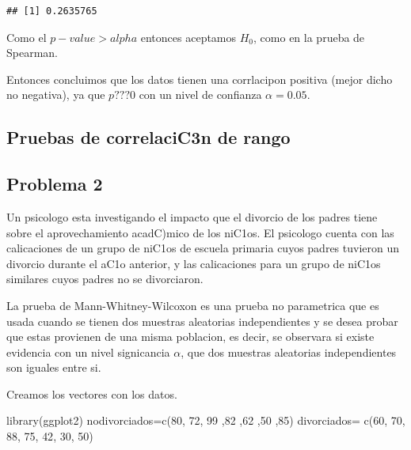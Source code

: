\documentclass[
]{article}
\newenvironment{Shaded}{\begin{snugshade}}{\end{snugshade}}
\newcommand{\DecValTok}[1]{\textcolor[rgb]{0.00,0.00,0.81}{#1}}
\newcommand{\FunctionTok}[1]{\textcolor[rgb]{0.00,0.00,0.00}{#1}}
\newcommand{\NormalTok}[1]{#1}
\newcommand{\OtherTok}[1]{\textcolor[rgb]{0.56,0.35,0.01}{#1}}
\newcommand{\SpecialCharTok}[1]{\textcolor[rgb]{0.00,0.00,0.00}{#1}}
\begin{document}
\begin{Shaded}
\end{Shaded}

\begin{verbatim}
## [1] 0.2635765
\end{verbatim}

Como el \(p-value>alpha\) entonces aceptamos \(H_{0}\), como en la
prueba de Spearman.

Entonces concluimos que los datos tienen una corrlacipon positiva (mejor
dicho no negativa), ya que \(p???0\) con un nivel de confianza
\(\alpha=0.05\).

\hypertarget{pruebas-de-correlacic3n-de-rango}{%
\subsection{Pruebas de correlaciC3n de
rango}\label{pruebas-de-correlacic3n-de-rango}}

\hypertarget{problema-2}{%
\subsection{Problema 2}\label{problema-2}}

Un psicologo esta investigando el impacto que el divorcio de los padres
tiene sobre el aprovechamiento acadC)mico de los niC1os. El psicologo
cuenta con las calicaciones de un grupo de niC1os de escuela primaria
cuyos padres tuvieron un divorcio durante el aC1o anterior, y las
calicaciones para un grupo de niC1os similares cuyos padres no se
divorciaron.

La prueba de Mann-Whitney-Wilcoxon es una prueba no parametrica que es
usada cuando se tienen dos muestras aleatorias independientes y se desea
probar que estas provienen de una misma poblacion, es decir, se
observara si existe evidencia con un nivel signicancia \(\alpha\), que
dos muestras aleatorias independientes son iguales entre si.

Creamos los vectores con los datos.

\begin{Shaded}
\begin{Highlighting}[]
\FunctionTok{library}\NormalTok{(ggplot2)}
\NormalTok{nodivorciados}\OtherTok{=}\FunctionTok{c}\NormalTok{(}\DecValTok{80}\NormalTok{, }\DecValTok{72}\NormalTok{, }\DecValTok{99}\NormalTok{ ,}\DecValTok{82}\NormalTok{ ,}\DecValTok{62}\NormalTok{ ,}\DecValTok{50}\NormalTok{ ,}\DecValTok{85}\NormalTok{)}
\NormalTok{divorciados}\OtherTok{=} \FunctionTok{c}\NormalTok{(}\DecValTok{60}\NormalTok{, }\DecValTok{70}\NormalTok{, }\DecValTok{88}\NormalTok{, }\DecValTok{75}\NormalTok{, }\DecValTok{42}\NormalTok{, }\DecValTok{30}\NormalTok{, }\DecValTok{50}\NormalTok{)}
\end{Highlighting}
\end{Shaded}
\end{document}
